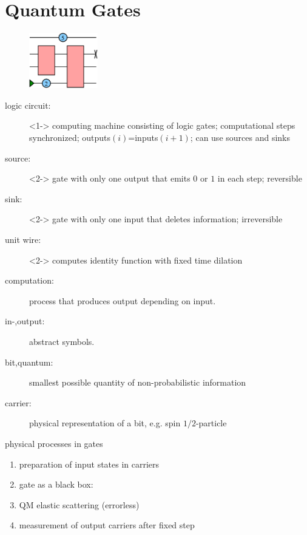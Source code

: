 \documentclass{beamer}
\begin{document}
\section{Quantum Gates}
%
\begin{frame}
	\begin{figure}
		\centering
		\includegraphics[width=3cm]{logic_circuit.png}
	\end{figure}
	\begin{description}
		\item[logic circuit:]<1-> computing machine consisting of logic gates; computational steps synchronized; outputs$(i)$=inputs$(i+1)$; can use sources and sinks
		\item[source:]<2-> gate with only one output that emits $0$ or $1$ in each step; reversible
		\item[sink:]<2-> gate with only one input that deletes information; irreversible
		\item[unit wire:]<2-> computes identity function with fixed time dilation
	\end{description}
\end{frame}

\begin{frame}
	\begin{description}
		\item[computation:] process that produces output depending on input.
		\item[in-,output:] abstract symbols.
		\item[bit,quantum:] smallest possible quantity of non-probabilistic information
		\item[carrier:] physical representation of a bit, e.g. spin $1/2$-particle
	\end{description}
	\begin{block}{physical processes in gates}
		\begin{enumerate}
			\item preparation of input states in carriers
			\item gate as a black box:
			\item QM elastic scattering (errorless)
			\item measurement of output carriers after fixed step
		\end{enumerate}
	\end{block}
\end{frame}
%
\end{document}
